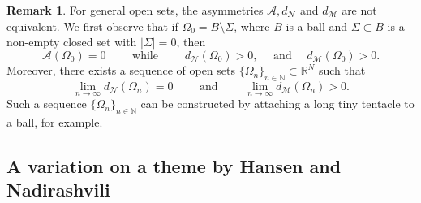 \documentclass{amsart}
\theoremstyle{definition}
\newtheorem{remark}[lemma]{Remark}
\numberwithin{equation}{section}
\begin{document}
\begin{remark}
For general open sets, the asymmetries $\mathcal{A}, d_\mathcal{N}$ and $d_\mathcal{M}$ are not equivalent. We first observe that if $\Omega_0=B\setminus \Sigma$, where $B$ is a ball and $\Sigma\subset B$ is a non-empty closed set with $|\Sigma|=0$, then
\[
\mathcal{A}(\Omega_0)=0\qquad \mbox{ while }\qquad  d_\mathcal{N}(\Omega_0)>0,\quad \mbox{ and }\quad d_\mathcal{M}(\Omega_0)>0.
\]
Moreover, there exists a sequence of open sets $\{\Omega_n\}_{n\in\mathbb{N}}\subset\mathbb{R}^N$ such that
\[
\lim_{n\to\infty} d_\mathcal{N}(\Omega_n)=0\qquad\mbox{ and }\qquad \lim_{n\to\infty} d_\mathcal{M}(\Omega_n)>0.
\]
Such a sequence $\{\Omega_n\}_{n\in\mathbb{N}}$ can be constructed by attaching a long tiny tentacle to a ball, for example.
\end{remark}


\subsection{A variation on a theme by Hansen and Nadirashvili}
\label{sec:24}
\end{document}
